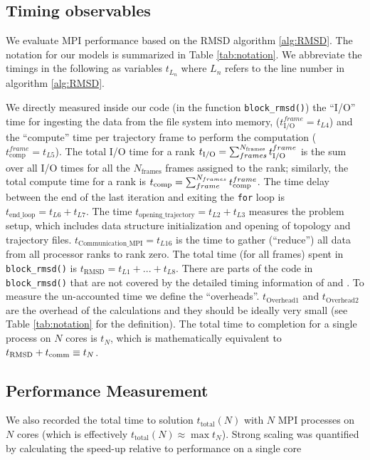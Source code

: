\label{methods}

\subsection{Timing observables}
We evaluate MPI performance based on the RMSD algorithm \ref{alg:RMSD}. 
The notation for our models is summarized in Table \ref{tab:notation}.
We abbreviate the timings in the following as variables $t_{L_{n}}$ where $L_{n}$ refers to the line number in algorithm \ref{alg:RMSD}.

We directly measured inside our code (in the function \texttt{block\_rmsd()}) the ``I/O'' time for
ingesting the data from the file system into memory, ($t_{\text{I/O}}^{frame} = t_{L4}$) and the ``compute'' time per
trajectory frame to perform the computation ($t_{\text{comp}}^{frame} = t_{L5}$).
The total I/O time for a rank  ${t}_{\text{I/O}} = \sum_{frames}^{N_{\text{frames}}} t_{\text{I/O}}^{frame}$ is the sum over all I/O times for all the $N_{\text{frames}}$ frames assigned to the rank; similarly, the total compute time for a rank is ${t}_{\text{comp}} = \sum_{frame}^{N_{frames}} t_{\text{comp}}^{frame}$. 
The time delay between the end of the last iteration and exiting the \texttt{for} loop is $t_{\text{end\_loop}} = t_{L6}+t_{L7}$.
The time $t_{\text{opening\_trajectory}} = t_{L2}+t_{L3}$ measures the problem setup, which includes data structure initialization and opening of topology and trajectory files.
$t_{\text{Communication\_{MPI}}} = t_{L16}$ is the time to gather (``reduce'') all data from all processor ranks to rank zero.
The total time (for all frames) spent in \texttt{block\_rmsd()} is $t_{\text{RMSD}} = t_{L1} + ...+ t_{L8}$. 
There are parts of the code in \texttt{block\_rmsd()} that are not covered by the detailed timing information of \tcomp and \tIO. 
To measure the un-accounted time we define the ``overheads''.
$t_{\text{Overhead1}}$ and $t_{\text{Overhead2}}$ are the overhead of the calculations and they should be ideally very small (see Table \ref{tab:notation} for the definition).  
The total time to completion for a single process on $N$ cores is $t_{N}$, which is mathematically equivalent to
$ t_{\text{RMSD}} + t_{\text{comm}} \equiv t_{N}$.

\subsection{Performance Measurement}
We also recorded the total time to solution $t_{\text{total}}(N)$ with $N$ MPI processes on $N$ cores (which is effectively
$t_{\text{total}}(N) \approx \max t_{N}$). 
Strong scaling was quantified by calculating the speed-up relative to performance on a single core


